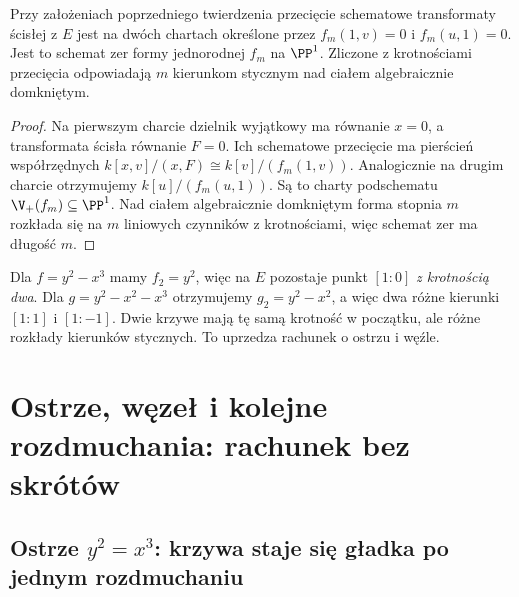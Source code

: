 \begin{wniosek}
\label{wn:ga5-tangent-directions}
Przy założeniach poprzedniego twierdzenia
przecięcie schematowe transformaty ścisłej z $E$
jest na dwóch chartach określone przez
$f_m(1,v)=0$ i $f_m(u,1)=0$. Jest to schemat zer
formy jednorodnej $f_m$ na $\PP^1$.
Zliczone z krotnościami przecięcia odpowiadają
$m$ kierunkom stycznym nad ciałem algebraicznie
domkniętym.
\end{wniosek}
\begin{proof}
Na pierwszym charcie dzielnik wyjątkowy ma równanie
$x=0$, a transformata ścisła równanie $F=0$.
Ich schematowe przecięcie ma pierścień współrzędnych
$k[x,v]/(x,F)\cong k[v]/(f_m(1,v))$.
Analogicznie na drugim charcie otrzymujemy
$k[u]/(f_m(u,1))$. Są to charty podschematu
$\V_+(f_m)\subseteq\PP^1$. Nad ciałem algebraicznie
domkniętym forma stopnia $m$ rozkłada się na
$m$ liniowych czynników z krotnościami, więc
schemat zer ma długość $m$.
\end{proof}

\begin{przyklad}
Dla $f=y^2-x^3$ mamy $f_2=y^2$, więc na $E$
pozostaje punkt $[1:0]$ \emph{z krotnością dwa}.
Dla $g=y^2-x^2-x^3$ otrzymujemy
$g_2=y^2-x^2$, a więc dwa różne kierunki
$[1:1]$ i $[1:-1]$. Dwie krzywe mają tę samą
krotność w początku, ale różne rozkłady kierunków
stycznych. To uprzedza rachunek o ostrzu i węźle.
\end{przyklad}

\section{Ostrze, węzeł i kolejne rozdmuchania: rachunek bez skrótów}
\label{sec:ga5-cusp-node}

\subsection[Ostrze: wygładzenie po jednym rozdmuchaniu]{Ostrze $y^2=x^3$: krzywa staje się gładka po jednym rozdmuchaniu}

